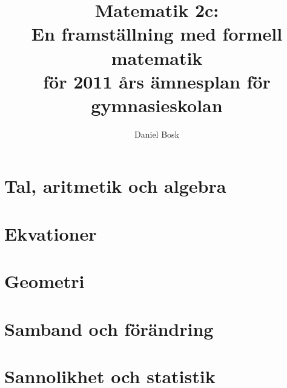 \documentclass[a4paper,titlepage,reqno,final,twoside]{amsbook}
\theoremstyle{definition}
\theoremstyle{remark}
\numberwithin{section}{chapter}
\numberwithin{equation}{chapter}
\begin{document}

\title[Matematik 2c]{
  Matematik 2c:\\
  En framställning med formell matematik\\
  för 2011 års ämnesplan för gymnasieskolan
}
\author{Daniel Bosk}

\frontmatter



\mainmatter
\ifdraft{
  \doublespacing
}{}

\part{Tal, aritmetik och algebra}



\part{Ekvationer}



\part{Geometri}


\part{Samband och förändring}


\part{Sannolikhet och statistik}




\appendix
\ifdraft{
  \doublespacing
}{}
%

\backmatter
\ifdraft{
  \singlespacing
}{}


\clearpage
\end{document}
